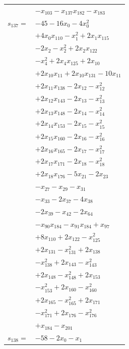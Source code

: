 \begin{longtable}{@{}r@{\;}l@{}}
 & \(\displaystyle -x_{103} -x_{137}x_{182} -x_{183}\) \\[3pt]
\(s_{137}=\) & \(\displaystyle -45 -16x_{0} -4x_{0}^{2}\) \\
 & \(\displaystyle +4x_{0}x_{110} -x_{1}^{2} +2x_{1}x_{115}\) \\
 & \(\displaystyle -2x_{2} -x_{2}^{2} +2x_{2}x_{122}\) \\
 & \(\displaystyle -x_{4}^{2} +2x_{4}x_{125} +2x_{10}\) \\
 & \(\displaystyle +2x_{10}x_{11} +2x_{10}x_{131} -10x_{11}\) \\
 & \(\displaystyle +2x_{11}x_{138} -2x_{12} -x_{12}^{2}\) \\
 & \(\displaystyle +2x_{12}x_{143} -2x_{13} -x_{13}^{2}\) \\
 & \(\displaystyle +2x_{13}x_{148} -2x_{14} -x_{14}^{2}\) \\
 & \(\displaystyle +2x_{14}x_{153} -2x_{15} -x_{15}^{2}\) \\
 & \(\displaystyle +2x_{15}x_{160} -2x_{16} -x_{16}^{2}\) \\
 & \(\displaystyle +2x_{16}x_{165} -2x_{17} -x_{17}^{2}\) \\
 & \(\displaystyle +2x_{17}x_{171} -2x_{18} -x_{18}^{2}\) \\
 & \(\displaystyle +2x_{18}x_{176} -5x_{21} -2x_{23}\) \\
 & \(\displaystyle -x_{27} -x_{29} -x_{31}\) \\
 & \(\displaystyle -x_{33} -2x_{37} -4x_{38}\) \\
 & \(\displaystyle -2x_{39} -x_{42} -2x_{64}\) \\
 & \(\displaystyle -x_{90}x_{184} -x_{91}x_{184} +x_{97}\) \\
 & \(\displaystyle +8x_{110} +2x_{122} -x_{125}^{2}\) \\
 & \(\displaystyle +2x_{131} -x_{131}^{2} +2x_{138}\) \\
 & \(\displaystyle -x_{138}^{2} +2x_{143} -x_{143}^{2}\) \\
 & \(\displaystyle +2x_{148} -x_{148}^{2} +2x_{153}\) \\
 & \(\displaystyle -x_{153}^{2} +2x_{160} -x_{160}^{2}\) \\
 & \(\displaystyle +2x_{165} -x_{165}^{2} +2x_{171}\) \\
 & \(\displaystyle -x_{171}^{2} +2x_{176} -x_{176}^{2}\) \\
 & \(\displaystyle +x_{184} -x_{201}\) \\[3pt]
\(s_{138}=\) & \(\displaystyle -58 -2x_{0} -x_{1}\) \\

\end{longtable}
